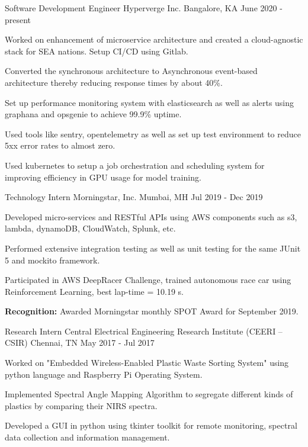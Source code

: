 \begin{cventries}
  \cventry
  {Software Development Engineer}
  {Hyperverge Inc.}
  {Bangalore, KA}
  {June 2020 - present}
  {
    \begin{cvitems}
      \item {Worked on enhancement of microservice architecture and created a cloud-agnostic stack for SEA nations. Setup CI/CD using Gitlab.}
      \item {Converted the synchronous architecture to Asynchronous event-based architecture thereby reducing response times by about 40\%.}    
      \item {Set up performance monitoring system with elasticsearch as well as alerts using graphana and opsgenie to achieve 99.9\% uptime.}
      \item {Used tools like sentry, opentelemetry as well as set up test environment to reduce 5xx error rates to almost zero.}
      \item {Used kubernetes to setup a job orchestration and scheduling system for improving efficiency in GPU usage for model training.}
    \end{cvitems}
  }
  \cventry
    {Technology Intern}
    {Morningstar, Inc.}
    {Mumbai, MH}
    {Jul 2019 - Dec 2019}
    {
      \begin{cvitems}
        \item {Developed micro-services and RESTful APIs using AWS components such as s3, lambda, dynamoDB, CloudWatch, Splunk, etc.}
        \item {Performed extensive integration testing as well as unit testing for the same JUnit 5 and mockito framework.}
        \item {Participated in AWS DeepRacer Challenge, trained autonomous race car using Reinforcement Learning, best lap-time = 10.19 s.}
        \item {\textbf{Recognition:} Awarded Morningstar monthly SPOT Award for September 2019.}
      \end{cvitems}
    }
  \cventry
    {Research Intern}
    {Central Electrical Engineering Research Institute (CEERI – CSIR)}
    {Chennai, TN}
    {May 2017 - Jul 2017}
    {
      \begin{cvitems}
        \item {Worked on "Embedded Wireless-Enabled Plastic Waste Sorting System" using python language and Raspberry Pi Operating System.}
        \item {Implemented Spectral Angle Mapping Algorithm to segregate different kinds of plastics by comparing their NIRS spectra.}
        \item {Developed a GUI in python using tkinter toolkit for remote monitoring, spectral data collection and information management.}
      \end{cvitems}
    }

\end{cventries}
